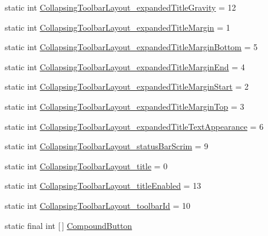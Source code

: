 \begin{DoxyCompactItemize}
\item 
static int \hyperlink{classandroid_1_1support_1_1design_1_1R_1_1styleable_a512c33aaaf433f1d80a20c2664d93cc6}{Collapsing\+Toolbar\+Layout\+\_\+expanded\+Title\+Gravity} = 12
\item 
static int \hyperlink{classandroid_1_1support_1_1design_1_1R_1_1styleable_a7f6c3d7589ba466516400c94b09af6dd}{Collapsing\+Toolbar\+Layout\+\_\+expanded\+Title\+Margin} = 1
\item 
static int \hyperlink{classandroid_1_1support_1_1design_1_1R_1_1styleable_af49b937af4809fe755f0935bab497665}{Collapsing\+Toolbar\+Layout\+\_\+expanded\+Title\+Margin\+Bottom} = 5
\item 
static int \hyperlink{classandroid_1_1support_1_1design_1_1R_1_1styleable_a35cd54b33a367b2c848a150b8b4c8924}{Collapsing\+Toolbar\+Layout\+\_\+expanded\+Title\+Margin\+End} = 4
\item 
static int \hyperlink{classandroid_1_1support_1_1design_1_1R_1_1styleable_a0f562825d10f9717d8465bda7c24e1ad}{Collapsing\+Toolbar\+Layout\+\_\+expanded\+Title\+Margin\+Start} = 2
\item 
static int \hyperlink{classandroid_1_1support_1_1design_1_1R_1_1styleable_aa857ae82aafd5733306283d8cebed1b9}{Collapsing\+Toolbar\+Layout\+\_\+expanded\+Title\+Margin\+Top} = 3
\item 
static int \hyperlink{classandroid_1_1support_1_1design_1_1R_1_1styleable_ac93bbda7f962bc3fa75ce23c2ec87ab8}{Collapsing\+Toolbar\+Layout\+\_\+expanded\+Title\+Text\+Appearance} = 6
\item 
static int \hyperlink{classandroid_1_1support_1_1design_1_1R_1_1styleable_a675be9c93480a98f854416553d174e4b}{Collapsing\+Toolbar\+Layout\+\_\+status\+Bar\+Scrim} = 9
\item 
static int \hyperlink{classandroid_1_1support_1_1design_1_1R_1_1styleable_aed337c7cc5f2d54034841fd6d7dfda1d}{Collapsing\+Toolbar\+Layout\+\_\+title} = 0
\item 
static int \hyperlink{classandroid_1_1support_1_1design_1_1R_1_1styleable_aee5150e8b214ad7200a094c9faf6bbee}{Collapsing\+Toolbar\+Layout\+\_\+title\+Enabled} = 13
\item 
static int \hyperlink{classandroid_1_1support_1_1design_1_1R_1_1styleable_af10a1e768d230d7c7f1117fe0ca3de0a}{Collapsing\+Toolbar\+Layout\+\_\+toolbar\+Id} = 10
\item 
static final int \mbox{[}$\,$\mbox{]} \hyperlink{classandroid_1_1support_1_1design_1_1R_1_1styleable_a1e3ef000b9dccc62673df5ec6d13a547}{Compound\+Button}
\item 

\end{DoxyCompactItemize}
